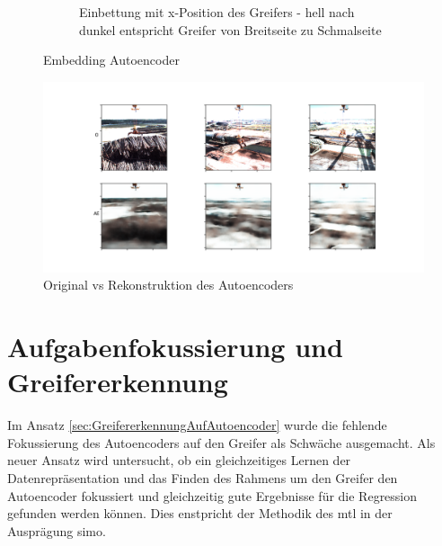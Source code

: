 \begin{figure}[h]
\begin{subfigure}[c]{0.49\textwidth}
			\caption{Einbettung mit x-Position des Greifers - hell nach dunkel entspricht Greifer von Breitseite zu Schmalseite}
			\label{img:Emb_x_AE}	
		\end{subfigure}
		\caption{Embedding Autoencoder}
		\label{img:EmbeddingAE_V}
	\end{figure}
	
	\begin{figure}[h]
		\centering
		\includegraphics[width=1\textwidth, center]{bilder/Hauptteil/Autoencoder_Grappel_Detection/OriginalPicturesAndReconstruction.png}
		\caption{Original vs Rekonstruktion des Autoencoders}
		\label{img:RekonstruktionAE}
	\end{figure}  
	
	
	
	\section{Aufgabenfokussierung und Greifererkennung}
	\label{sec:MultiTaskGreifererkennung}
	Im Ansatz \ref{sec:GreifererkennungAufAutoencoder} wurde die fehlende Fokussierung des Autoencoders auf den Greifer als Schwäche ausgemacht. Als neuer Ansatz wird untersucht, ob ein gleichzeitiges Lernen der Datenrepräsentation und das Finden des Rahmens um den Greifer den Autoencoder fokussiert und gleichzeitig gute Ergebnisse für die Regression gefunden werden können. Dies enstpricht der Methodik des \ac{mtl} in der Ausprägung \ac{simo}.
	
